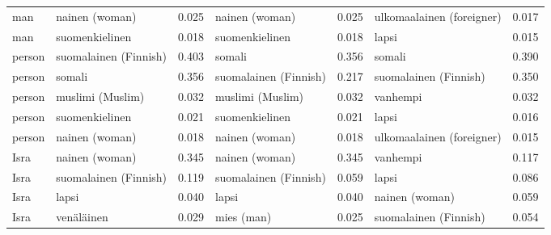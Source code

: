 \begin{longtable}{llrlrlr}
    man &            nainen (woman) &                            0.025 &            nainen (woman) &                                 0.025 & ulkomaalainen (foreigner) &                           0.017 \\
    man &            suomenkielinen &                            0.018 &            suomenkielinen &                                 0.018 &                     lapsi &                           0.015 \\
 person &     suomalainen (Finnish) &                            0.403 &                    somali &                                 0.356 &                    somali &                           0.390 \\
 person &                    somali &                            0.356 &     suomalainen (Finnish) &                                 0.217 &     suomalainen (Finnish) &                           0.350 \\
 person &          muslimi (Muslim) &                            0.032 &          muslimi (Muslim) &                                 0.032 &                  vanhempi &                           0.032 \\
 person &            suomenkielinen &                            0.021 &            suomenkielinen &                                 0.021 &                     lapsi &                           0.016 \\
 person &            nainen (woman) &                            0.018 &            nainen (woman) &                                 0.018 & ulkomaalainen (foreigner) &                           0.015 \\
   Isra &            nainen (woman) &                            0.345 &            nainen (woman) &                                 0.345 &                  vanhempi &                           0.117 \\
   Isra &     suomalainen (Finnish) &                            0.119 &     suomalainen (Finnish) &                                 0.059 &                     lapsi &                           0.086 \\
   Isra &                     lapsi &                            0.040 &                     lapsi &                                 0.040 &            nainen (woman) &                           0.059 \\
   Isra &                venäläinen &                            0.029 &                mies (man) &                                 0.025 &     suomalainen (Finnish) &                           0.054 \\

\end{longtable}
